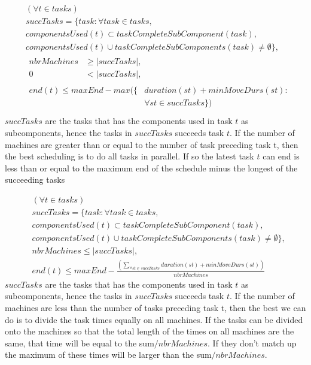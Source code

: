 \documentclass[10pt,a4paper]{report}
\begin{document}
\begin{equation}\label{eq:72}
\begin{aligned}
&(\forall t \in tasks) \\
&succTasks = \{task : \forall task \in tasks,\\
&componentsUsed(t) \subset taskCompleteSubComponent(task), \\
&componentsUsed(t) \cup taskCompleteSubComponents(task) \neq \emptyset\}, \\
&\begin{aligned}
nbrMachines &\ge |succTasks|,\\
0 &< |succTasks|,
\end{aligned}\\
&\begin{aligned}
end(t) \le maxEnd - max(\{&duration(st) + minMoveDurs(st) :\\
&\forall st \in succTasks\})
\end{aligned}\\
\end{aligned}
\end{equation}
$succTasks$ are the tasks that has the components used in task $t$ as subcomponents, hence the tasks in $succTasks$ succeeds task $t$. If the number of machines are greater than or equal to the number of task preceding task t, then the best scheduling is to do all tasks in parallel. If so the latest task $t$ can end is less than or equal to the maximum end of the schedule minus the longest of the succeeding tasks

\begin{equation}\label{eq:73}
\begin{aligned}
&(\forall t \in tasks)\\
&succTasks = \{task : \forall task \in tasks, \\
&componentsUsed(t) \subset taskCompleteSubComponent(task), \\
&componentsUsed(t) \cup taskCompleteSubComponents(task) \neq \emptyset\}, \\
&nbrMachines \le |succTasks|, \\
&end(t) \le maxEnd - \frac{\left(\sum_{\forall st \in succTasks}duration(st) + minMoveDurs(st)\right)}{nbrMachines}
\end{aligned}
\end{equation}
$succTasks$ are the tasks that has the components used in task $t$ as subcomponents, hence the tasks in $succTasks$ succeeds task $t$. If the number of machines are less than the number of tasks preceding task t, then the best we can do is to divide the task times equally on all machines. If the tasks can be divided onto the machines so that the total length of the times on all machines are the same, that time will be equal to the sum$/nbrMachines$. If they don't match up the maximum of these times will be larger than the sum$/nbrMachines$.
\end{document}
